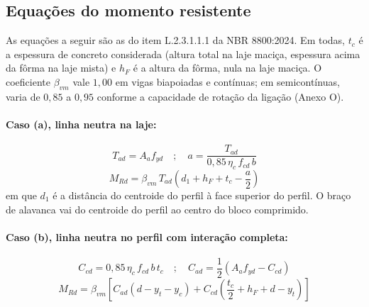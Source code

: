 \documentclass[11pt,a4paper]{article}
\begin{document}
\subsection{Equações do momento resistente}

As equações a seguir são as do item L.2.3.1.1.1 da NBR 8800:2024. Em todas, $t_c$ é a espessura de concreto considerada (altura total na laje maciça, espessura acima da fôrma na laje mista) e $h_F$ é a altura da fôrma, nula na laje maciça. O coeficiente $\beta_{vm}$ vale $1{,}00$ em vigas biapoiadas e contínuas; em semicontínuas, varia de $0{,}85$ a $0{,}95$ conforme a capacidade de rotação da ligação (Anexo O).

\paragraph{Caso (a), linha neutra na laje:}
\begin{equation}
  T_{ad} = A_a f_{yd} \quad ; \quad a = \frac{T_{ad}}{0{,}85\,\eta_c\,f_{cd}\,b}
  \label{eq:caso-a-forca}
\end{equation}
\begin{equation}
  M_{Rd} = \beta_{vm}\, T_{ad} \left(d_1 + h_F + t_c - \frac{a}{2}\right)
  \label{eq:caso-a-mrd}
\end{equation}
em que $d_1$ é a distância do centroide do perfil à face superior do perfil. O braço de alavanca vai do centroide do perfil ao centro do bloco comprimido.

\paragraph{Caso (b), linha neutra no perfil com interação completa:}
\begin{equation}
  C_{cd} = 0{,}85\,\eta_c\,f_{cd}\,b\,t_c \quad ; \quad C_{ad} = \frac{1}{2}\left(A_a f_{yd} - C_{cd}\right)
  \label{eq:caso-b-forca}
\end{equation}
\begin{equation}
  M_{Rd} = \beta_{vm}\left[C_{ad}(d - y_t - y_c) + C_{cd}\left(\frac{t_c}{2} + h_F + d - y_t\right)\right]
  \label{eq:caso-b-mrd}
\end{equation}
\end{document}
